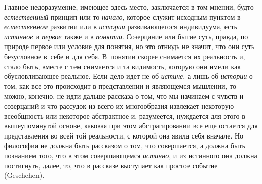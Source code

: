 Главное недоразумение, имеющее здесь место, заключается в том
мнении, будто {\em естественный} принцип или то {\em начало}, которое
служит исходным пунктом в {\em естественном} развитии или в {\em истории}
развивающегося индивидуума, есть {\em истинное} и {\em первое} также и в
{\em понятии}. Созерцание
или бытие суть, правда, по природе первое или условие для понятия, но это
отнюдь не значит, что они суть безусловное в~себе и для себя. В~понятии
скорее снимается их реальность и, стало быть, вместе с тем снимается и та
видимость, которую они имели как обусловливающее реальное. Если дело идет
не об {\em истине}, а лишь об {\em истории} о
том, как все это происходит в представлении и являющемся мышлении, то
можно, конечно, не идти дальше рассказа о том, что мы начинаем с чувств и
созерцаний и что рассудок из всего их многообразия извлекает некоторую
всеобщность или некоторое абстрактное и, разумеется, нуждается для этого в
вышеупомянутой основе, каковая при этом абстрагировании все еще остается
для представления во всей той реальности, с которой она явила себя вначале.
Но философия не должна быть рассказом о том, что совершается, а должна быть
познанием того, что в этом совершающемся {\em истинно}, и из
истинного она должна постигнуть, далее, то, что в рассказе выступает как
простое событие (Geschehen).

